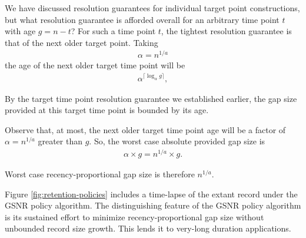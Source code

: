 We have discussed resolution guarantees for individual target point constructions, but what resolution guarantee is afforded overall for an arbitrary time point $t$ with age $g = n - t$?
For such a time point $t$, the tightest resolution guarantee is that of the next older target point.
Taking
\begin{align*}
\alpha = n^{1/a}
\end{align*}
the age of the next older target time point will be
\begin{align*}
\alpha^{ \lceil \log_{\alpha} g \rceil },
\end{align*}

By the target time point resolution guarantee we established earlier, the gap size provided at this target time point is bounded by its age.

Observe that, at most, the next older target time point age will be a factor of $\alpha = n^{1/a}$ greater than $g$.
So, the worst case absolute provided gap size is
\begin{align*}
\alpha \times g = n^{1/a} \times g.
\end{align*}

Worst case recency-proportional gap size is therefore $n^{1/a}$.

Figure \ref{fig:retention-policies} includes a time-lapse of the extant record under the GSNR policy algorithm.
The distinguishing feature of the GSNR policy algorithm is its sustained effort to minimize recency-proportional gap size without unbounded record size growth.
This lends it to very-long duration applications.

% 
% 
% 

% 
% 

